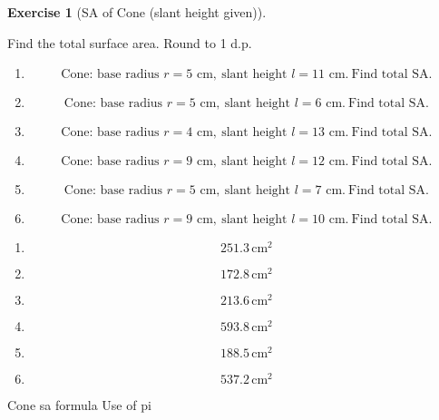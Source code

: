 \documentclass[
  letterpaper,
  DIV=11,
  numbers=noendperiod]{scrreprt}
\theoremstyle{definition}
\newtheorem{exercise}{Exercise}[chapter]
\theoremstyle{remark}
\begin{document}
\begin{exercise}[SA of Cone (slant height
given)]\protect\hypertarget{exr-cur-15}{}\label{exr-cur-15}

Find the total surface area. Round to 1 d.p.

\begin{enumerate}
\def\labelenumi{\alph{enumi})}
\item
  \[\text{Cone: base radius }r=5\text{ cm},\ \text{slant height }l=11\text{ cm.}\ \text{Find total SA.}\]
\item
  \[\text{Cone: base radius }r=5\text{ cm},\ \text{slant height }l=6\text{ cm.}\ \text{Find total SA.}\]
\item
  \[\text{Cone: base radius }r=4\text{ cm},\ \text{slant height }l=13\text{ cm.}\ \text{Find total SA.}\]
\item
  \[\text{Cone: base radius }r=9\text{ cm},\ \text{slant height }l=12\text{ cm.}\ \text{Find total SA.}\]
\item
  \[\text{Cone: base radius }r=5\text{ cm},\ \text{slant height }l=7\text{ cm.}\ \text{Find total SA.}\]
\item
  \[\text{Cone: base radius }r=9\text{ cm},\ \text{slant height }l=10\text{ cm.}\ \text{Find total SA.}\]
\end{enumerate}

\begin{tcolorbox}[enhanced jigsaw, opacitybacktitle=0.6, coltitle=black, arc=.35mm, colframe=quarto-callout-tip-color-frame, colback=white, bottomrule=.15mm, left=2mm, colbacktitle=quarto-callout-tip-color!10!white, titlerule=0mm, opacityback=0, title=\textcolor{quarto-callout-tip-color}{\faLightbulb}\hspace{0.5em}{🔍 View Solution}, leftrule=.75mm, breakable, rightrule=.15mm, bottomtitle=1mm, toptitle=1mm, toprule=.15mm]

\begin{enumerate}
\def\labelenumi{\alph{enumi})}
\item
  \[251.3\,\text{cm}^{2}\]
\item
  \[172.8\,\text{cm}^{2}\]
\item
  \[213.6\,\text{cm}^{2}\]
\item
  \[593.8\,\text{cm}^{2}\]
\item
  \[188.5\,\text{cm}^{2}\]
\item
  \[537.2\,\text{cm}^{2}\]
\end{enumerate}

\end{tcolorbox}

{Cone sa formula} {Use of pi}

\end{exercise}
\end{document}
